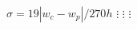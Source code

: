 \documentclass[12pt,oneside]{book}
\begin{document}
\begin{spacing}{1.2}
\begin{algorithm}[H]
\begin{algorithmic}[1]
							\STATE $ \sigma = 19 | w_{c} - w_{p} | / 270h $
							\STATE $ \vdots $
							\STATE $ \vdots $ 
							\STATE $ \vdots $
						\ENDWHILE
					\end{algorithmic}
				\end{algorithm}
			

\end{spacing}
\end{document}
